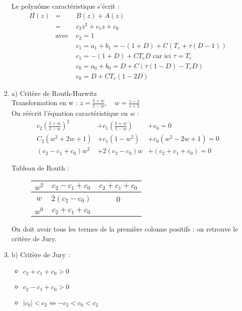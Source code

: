\documentclass[../main.tex]{subfiles}
\begin{document}
\begin{enumerate}
Le polynôme caractéristique s'écrit :
\begin{eqnarray*}
\Pi(z) & = &  B(z) + A(z)  \\
& = &  c_2 z^2 + c_1 z + c_0 \\
& \text{avec } & c_2 = 1 \\
& & c_1 = a_1 + b_1  = -(1+D) + C(T_e + \tau (D-1)) \\
& & c_1 = -(1+D) + CT_eD \text{ car ici } \tau = T_e \\
& & c_0 = a_0 + b_0 = D + C(\tau(1-D) - T_e D) \\
& & c_0 = D + CT_e(1-2D)
\end{eqnarray*}


\item a) Critère de Routh-Hurwitz \\
Transformation en w : \( z = \frac{1+w}{1-w}, \quad w = \frac{z-1}{z+1} \) \\

On réécrit l'équation caractéristique en $w$ :
\begin{eqnarray*}
c_2 (\frac{1+w}{1-w})^2 & + c_1(\frac{1+w}{1-w}) & + c_0  = 0 \\
C_2 (w^2 + 2w + 1) & + c_1(1-w^2) & + c_0(w^2 -2w+1)  = 0 \\
(c_2-c_1+c_0)w^2 & + 2(c_2-c_0)w & + (c_2+c_1+c_0)  = 0
\end{eqnarray*}

Tableau de Routh :\\
\begin{figure}[h!]
\centering
\begin{tabular}{|c|c|c|}
\hline
$w^2$ & $c_2-c_1+c_0$ & $c_2+c_1+c_0$ \\
\hline
$w$ & $2(c_2-c_0)$ & 0 \\
\hline
$w^0$ & $c_2+c_1+c_0$ & \\
\hline
\end{tabular}

\end{figure}


On doit avoir tous les termes de la première colonne positifs : on retrouve le critère de Jury.



\item b) Critère de Jury :
\begin{itemize}
\item $c_2 + c_1 + c_0 > 0$
\item $c_2 - c_1 + c_0 > 0$
\item $|c_0| < c_2 \Leftrightarrow -c_2 < c_0 < c_2$
\end{itemize}


\end{enumerate}
\end{document}
